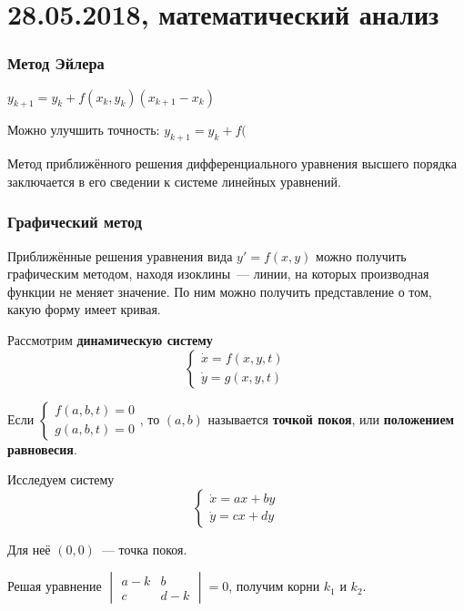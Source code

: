 \chapter{28.05.2018, математический анализ}
\subsection{Метод Эйлера}
$y_{k+1} = y_k + f(x_k, y_k) (x_{k+1} - x_k)$

Можно улучшить точность:
$y_{k+1} = y_k + f($

Метод приближённого решения дифференциального уравнения высшего порядка заключается в его сведении к системе линейных уравнений.

\subsection{Графический метод}
Приближённые решения уравнения вида $y' = f(x, y)$ можно получить графическим методом, находя изоклины~--- линии, на которых производная функции не меняет значение.
По ним можно получить представление о том, какую форму имеет кривая.

Рассмотрим \textbf{динамическую систему}
\begin{equation*}
\begin{cases}
\dot x = f(x, y, t) \\
\dot y = g(x, y, t)
\end{cases}
\end{equation*}

Если
$\begin{cases}
f(a, b, t) = 0 \\
g(a, b, t) = 0
\end{cases}$, то $(a, b)$ называется \textbf{точкой покоя}, или \textbf{положением равновесия}.

Исследуем систему
\begin{equation*}
\begin{cases}
\dot x = ax + by \\
\dot y = cx + dy
\end{cases}
\end{equation*}

Для неё $(0, 0)$~--- точка покоя.

Решая уравнение
$\begin{vmatrix}
a - k & b \\
c & d - k
\end{vmatrix} = 0$, получим корни $k_1$ и $k_2$.


